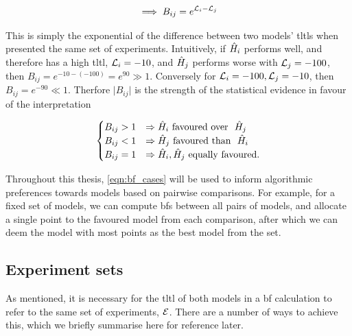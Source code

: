 \begin{equation}
    \label{eqn:bf_succinct}
    \implies B_{ij} = e^{{\mathcal{L}}_{i} - {\mathcal{L}}_{j}}    
\end{equation}


This is simply the exponential of the difference between two models' \glspl{tltl} when presented the same set of \glspl{experiment}. 
Intuitively, if $\hat{H}_i$ performs well, and therefore has a high \gls{tltl}, ${\mathcal{L}}_{i}=-10$, 
    and $\hat{H}_j$ performs worse with ${\mathcal{L}}_{j}=-100$, then $B_{ij} = e^{-10-(-100)} = e^{90} \gg 1$.
Conversely for ${\mathcal{L}}_{i}=-100, {\mathcal{L}}_{j}=-10$, then $B_{ij} = e^{-90} \ll 1$. 
Therfore $\lvert B_{ij} \rvert$ is the strength of the statistical evidence
    in favour of the interpretation 

\begin{equation}
    \label{eqn:bf_cases}
    \begin{cases}
        B_{ij} > 1 & \Rightarrow \hat{H}_i \text{\ favoured over \ } \hat{H}_j \\
        B_{ij} < 1 & \Rightarrow \hat{H}_j \text{\ favoured than \ } \hat{H}_i \\
        B_{ij} = 1 & \Rightarrow \hat{H}_i, \hat{H}_j \text{\ equally favoured}. \\
    \end{cases}
\end{equation} 

Throughout this thesis, \cref{eqn:bf_cases} will be used to inform algorithmic 
    preferences towards models based on pairwise comparisons.
For example, for a fixed set of models,
    we can compute \glspl{bf} between all pairs of models, 
    and allocate a single point to the favoured model from each comparison, 
    after which we can deem the model with most points as the best model from the set. 

\subsection{Experiment sets}\label{sec:experiments_for_bf}
As mentioned, it is necessary for the \gls{tltl} of both models in a \gls{bf} calculation to
    refer to the same set of \glspl{experiment}, ${ \mathcal{E} }$. 
There are a number of ways to achieve this, 
    which we briefly summarise here for reference later. 
\par 

